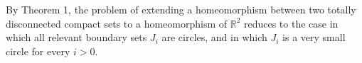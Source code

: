 By Theorem 1, the problem of extending a homeomorphism between two totally disconnected compact sets to a homeomorphism of $\mathbb{R}^2$ reduces to the case in which all relevant boundary sets $J_i$ are circles, and in which $J_i$ is a very small circle for every $i > 0$.
